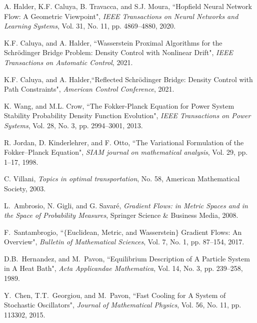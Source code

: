 \documentclass[10pt,twocolumn]{IEEEtran}
\begin{document}
\begin{thebibliography}{99}
A. Halder, K.F. Caluya, B. Travacca, and S.J. Moura, ``Hopfield Neural Network Flow: A Geometric Viewpoint", \emph{IEEE Transactions on Neural Networks and Learning Systems}, Vol. 31, No. 11, pp. 4869--4880, 2020. 


K.F. Caluya, and A. Halder, ``Wasserstein Proximal Algorithms for the Schr\"{o}dinger Bridge Problem: Density Control with Nonlinear Drift", \emph{IEEE Transactions on Automatic Control}, 2021.

K.F. Caluya, and A. Halder,``Reflected Schr\"{o}dinger Bridge: Density Control with Path Constraints", \emph{American Control Conference}, 2021.



K. Wang, and M.L. Crow, ``The Fokker-Planck Equation for Power System Stability Probability Density Function Evolution", \emph{IEEE Transactions on Power Systems}, Vol. 28, No. 3, pp. 2994--3001, 2013.


R. Jordan, D. Kinderlehrer, and F. Otto, ``The Variational Formulation of the Fokker--Planck Equation", \emph{SIAM journal on mathematical analysis}, Vol. 29, pp. 1--17, 1998.

C. Villani, \emph{Topics in optimal transportation}, No. 58, American Mathematical Society, 2003.

L.~Ambrosio, N. Gigli, and G. Savar{\'e}, \emph{Gradient Flows: in Metric Spaces and in the Space of Probability Measures}, Springer Science \& Business Media, 2008.

F.~Santambrogio, ``$\{$Euclidean, Metric, and Wasserstein$\}$ Gradient Flows: An Overview", \emph{Bulletin of Mathematical Sciences}, Vol. 7, No. 1, pp. 87--154, 2017. 


D.B.~Hernandez, and M.~Pavon, ``Equilibrium Description of A Particle System in A Heat Bath", \emph{Acta Applicandae Mathematica}, Vol. 14, No. 3, pp. 239--258, 1989.

Y.~Chen, T.T.~Georgiou, and M.~Pavon, ``Fast Cooling for A System of Stochastic Oscillators", \emph{Journal of Mathematical Physics}, Vol. 56, No. 11, pp. 113302, 2015.


\end{thebibliography}
\end{document}
